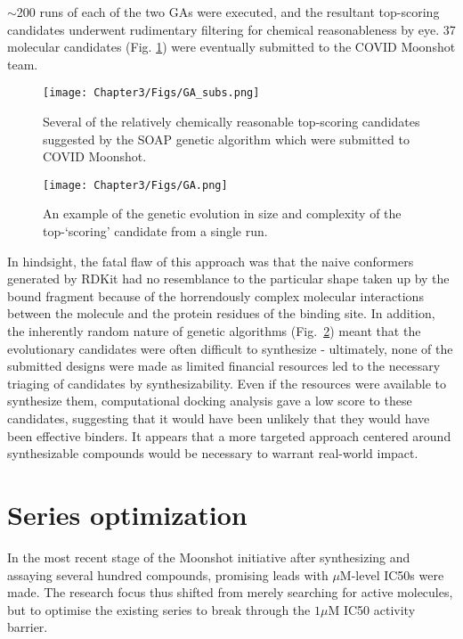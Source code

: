 $\sim$200 runs of each of the two GAs were executed, and the resultant top-scoring candidates underwent rudimentary filtering for chemical reasonableness by eye. 37 molecular candidates (Fig. \ref{fig:GA_subs}) were eventually submitted to the COVID Moonshot team. 

\begin{figure}[!h] %
\centering
\texttt{[image: Chapter3/Figs/GA\_subs.png]}
\caption{\label{fig:GA_subs} Several of the relatively chemically reasonable top-scoring candidates suggested by the SOAP genetic algorithm which were submitted to COVID Moonshot.}
\end{figure}

\begin{figure}[!h] %
\centering
\texttt{[image: Chapter3/Figs/GA.png]}
\caption{\label{fig:GA_example} An example of the genetic evolution in size and complexity of the top-`scoring' candidate from a single run.}
\end{figure}

In hindsight, the fatal flaw of this approach was that the naive conformers generated by RDKit had no resemblance to the particular shape taken up by the bound fragment because of the horrendously complex molecular interactions between the molecule and the protein residues of the binding site. In addition, the inherently random nature of genetic algorithms (Fig.~\ref{fig:GA_example}) meant that the evolutionary candidates were often difficult to synthesize - ultimately, none of the submitted designs were made as limited financial resources led to the necessary triaging of candidates by synthesizability. Even if the resources were available to synthesize them, computational docking analysis gave a low score to these candidates, suggesting that it would have been unlikely that they would have been effective binders. It appears that a more targeted approach centered around synthesizable compounds would be necessary to warrant real-world impact.

\section{Series optimization}
In the most recent stage of the Moonshot initiative after synthesizing and assaying several hundred compounds, promising leads with $\mu$M-level IC50s were made. The research focus thus shifted from merely searching for active molecules, but to optimise the existing series to break through the $1\mu$M IC50 activity barrier.

